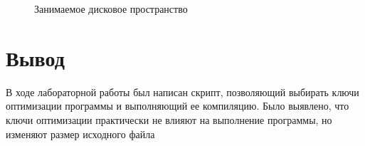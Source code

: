 \documentclass[a4paper,12pt]{article}
\begin{document}
      
      
      \begin{figure}[!th]
            \centering
            \caption{ Занимаемое дисковое пространство}
      \end{figure}
 
       \clearpage 
     
     \section*{Вывод}
     В ходе лабораторной работы был написан скрипт, позволяющий выбирать ключи оптимизации программы и выполняющий ее компиляцию.
    Было выявлено, что ключи оптимизации практически не влияют на выполнение программы, но изменяют размер исходного файла
    
\end{document}
